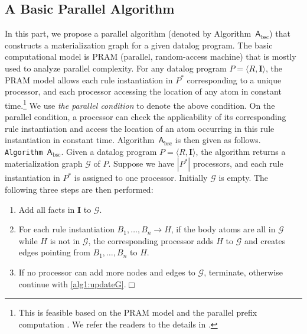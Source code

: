 \subsection{A Basic Parallel Algorithm}
\label{sec:alg-bsc}

In this part, we propose a parallel algorithm
(denoted by Algorithm~$\mathsf{A}_{\text{bsc}}$) that constructs a materialization graph for a given datalog program.
The basic computational model is PRAM (parallel, random-access machine) that is mostly used to analyze parallel
complexity. For any datalog program $P=\langle R, \textbf{I}\rangle$, the PRAM model
allows each rule instantiation in $P^*$ corresponding to a unique processor, and each processor accessing the
location of any atom in constant time.\footnote{This is feasible based on the PRAM model and
the parallel prefix computation \cite{LaFi80a}. We refer the readers to the details in \cite{Raymond95}.} 
We use \emph{the parallel condition} to denote the above condition.
On the parallel condition, a processor can check the applicability of its corresponding
rule instantiation and access the location of an atom occurring in this rule instantiation in constant time.
Algorithm~$\mathsf{A}_{\text{bsc}}$ is then given as follows.\\


\noindent\texttt{Algorithm~$\mathsf{A}_{\text{bsc}}$}. Given a datalog program $P=\langle R, \textbf{I}\rangle$,
the algorithm returns a materialization graph $\mathcal{G}$ of $P$.
Suppose we have $|P^*|$ processors, and each rule instantiation in $P^*$ is
assigned to one processor.
Initially $\mathcal{G}$ is empty. The following three steps are then performed:
\begin{enumerate}[leftmargin=8ex,label=(\textit{Step \arabic*}),ref=Step~\arabic*]
\item Add all facts in $\textbf{I}$ to $\mathcal{G}$.\label{alg1:addFacts}
\item For each rule instantiation $B_1,\ldots,B_n\rightarrow H$, if the body atoms are all
    in $\mathcal{G}$ while $H$ is not in $\mathcal{G}$,
    the corresponding processor adds $H$ to $\mathcal{G}$ and creates edges pointing
    from $B_1,\ldots,B_n$ to $H$.\label{alg1:updateG}
\item If no processor can add more nodes and edges to $\mathcal{G}$,
  terminate, otherwise continue with \ref{alg1:updateG}.\label{alg1:halt}\hfill$\Box$
\end{enumerate}

